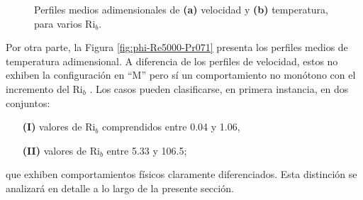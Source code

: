 \begin{figure}[H]
  \centering
  \caption{Perfiles medios adimensionales de \textbf{(a)} velocidad y \textbf{(b)} temperatura, para varios Ri$_b$.}
\end{figure}

Por otra parte, la Figura \ref{fig:phi-Re5000-Pr071} presenta los perfiles medios de temperatura adimensional. A diferencia de los perfiles de velocidad, estos no exhiben la configuración en ``M'' pero sí un comportamiento no monótono con el incremento del Ri$_b$ \cite{you2003direct, steiner1971reverse}. Los casos pueden clasificarse, en primera instancia, en dos conjuntos:

\begin{itemize}

\item[\textbf{(I)}] valores de Ri$_b$ comprendidos entre 0.04 y 1.06,

\item[\textbf{(II)}] valores de Ri$_b$ entre 5.33 y 106.5;

\end{itemize}
que exhiben comportamientos físicos claramente diferenciados. Esta distinción se analizará en detalle a lo largo de la presente sección.

